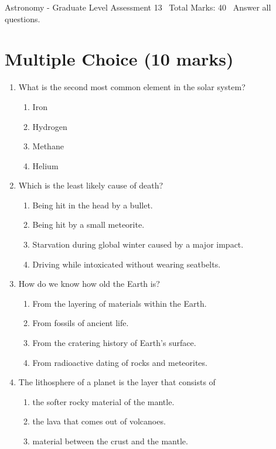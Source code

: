 \documentclass[12pt]{article}
\begin{document}
\begin{center}
Astronomy - Graduate Level Assessment 13 \
Total Marks: 40 \
Answer all questions.
\end{center}

\section*{Multiple Choice (10 marks)}
\begin{enumerate}[label=\arabic*.]
\item What is the second most common element in the solar system?
\begin{enumerate}[label=(\alph*)]
    \item Iron
    \item Hydrogen
    \item Methane
    \item Helium
\end{enumerate}
\item Which is the least likely cause of death?
\begin{enumerate}[label=(\alph*)]
    \item Being hit in the head by a bullet.
    \item Being hit by a small meteorite.
    \item Starvation during global winter caused by a major impact.
    \item Driving while intoxicated without wearing seatbelts.
\end{enumerate}
\item How do we know how old the Earth is?
\begin{enumerate}[label=(\alph*)]
    \item From the layering of materials within the Earth.
    \item From fossils of ancient life.
    \item From the cratering history of Earth's surface.
    \item From radioactive dating of rocks and meteorites.
\end{enumerate}
\item The lithosphere of a planet is the layer that consists of
\begin{enumerate}[label=(\alph*)]
    \item the softer rocky material of the mantle.
    \item the lava that comes out of volcanoes.
    \item material between the crust and the mantle.

\end{enumerate}
\end{enumerate}
\end{document}

